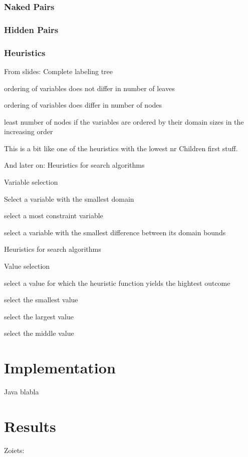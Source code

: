 \documentclass[11pt]{article} %
\begin{document}
\subsubsection{Naked Pairs}

\subsubsection{Hidden Pairs}

\subsubsection{Heuristics}

From slides:
Complete labeling tree

ordering of variables does not differ in
number of leaves

ordering of variables does differ in number
of nodes

least number of nodes if the variables are
ordered by their domain sizes in the
increasing order

This is a bit like one of the heuristics with the lowest nr Children first stuff.

And later on:
Heuristics for search algorithms

Variable selection

Select a variable with the smallest domain

select a most constraint variable


select a variable with the smallest difference between its domain bounds

Heuristics for search algorithms

Value selection

select a value for which the heuristic function yields the hightest outcome

select the smallest value

select the largest value

select the middle value


\section{Implementation}

Java blabla

\section{Results}

Zoiets:
\end{document}
